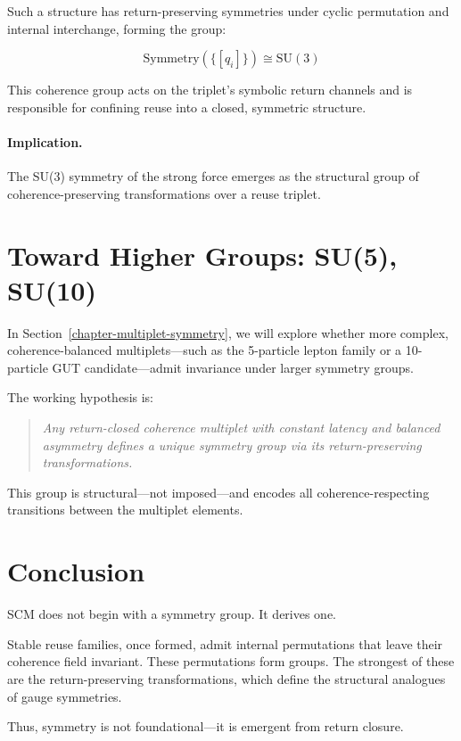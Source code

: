 Such a structure has return-preserving symmetries under cyclic permutation and internal interchange, forming the group:

\[
\text{Symmetry}(\{[q_i]\}) \cong \text{SU}(3)
\]

This coherence group acts on the triplet's symbolic return channels and is responsible for confining reuse into a closed, symmetric structure.

\paragraph{Implication.}
The SU(3) symmetry of the strong force emerges as the structural group of coherence-preserving transformations over a reuse triplet.

\section{Toward Higher Groups: SU(5), SU(10)}

In Section~\ref{chapter-multiplet-symmetry}, we will explore whether more complex, coherence-balanced multiplets—such as the 5-particle lepton family or a 10-particle GUT candidate—admit invariance under larger symmetry groups.

The working hypothesis is:

\begin{quote}
\textit{Any return-closed coherence multiplet with constant latency and balanced asymmetry defines a unique symmetry group via its return-preserving transformations.}
\end{quote}

This group is structural—not imposed—and encodes all coherence-respecting transitions between the multiplet elements.

\section{Conclusion}

SCM does not begin with a symmetry group. It derives one.

Stable reuse families, once formed, admit internal permutations that leave their coherence field invariant. These permutations form groups. The strongest of these are the return-preserving transformations, which define the structural analogues of gauge symmetries.

Thus, symmetry is not foundational—it is emergent from return closure.


